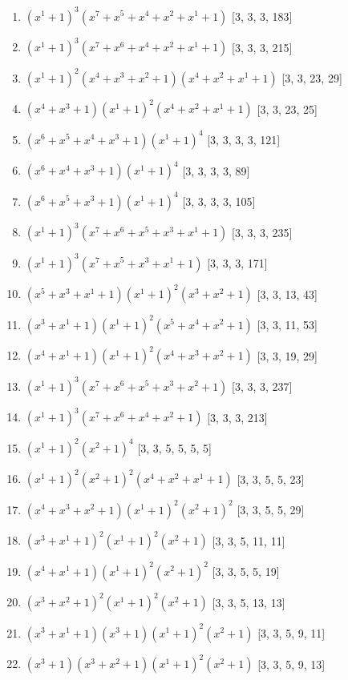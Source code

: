 \documentclass[10pt,twocolumn]{article}
\begin{document}
\begin{enumerate}
\item $(x^{1} + 1)^{3}(x^{7} + x^{5} + x^{4} + x^{2} + x^{1} + 1)$  [3, 3, 3, 183]
\item $(x^{1} + 1)^{3}(x^{7} + x^{6} + x^{4} + x^{2} + x^{1} + 1)$  [3, 3, 3, 215]
\item $(x^{1} + 1)^{2}(x^{4} + x^{3} + x^{2} + 1)(x^{4} + x^{2} + x^{1} + 1)$  [3, 3, 23, 29]
\item $(x^{4} + x^{3} + 1)(x^{1} + 1)^{2}(x^{4} + x^{2} + x^{1} + 1)$  [3, 3, 23, 25]
\item $(x^{6} + x^{5} + x^{4} + x^{3} + 1)(x^{1} + 1)^{4}$  [3, 3, 3, 3, 121]
\item $(x^{6} + x^{4} + x^{3} + 1)(x^{1} + 1)^{4}$  [3, 3, 3, 3, 89]
\item $(x^{6} + x^{5} + x^{3} + 1)(x^{1} + 1)^{4}$  [3, 3, 3, 3, 105]
\item $(x^{1} + 1)^{3}(x^{7} + x^{6} + x^{5} + x^{3} + x^{1} + 1)$  [3, 3, 3, 235]
\item $(x^{1} + 1)^{3}(x^{7} + x^{5} + x^{3} + x^{1} + 1)$  [3, 3, 3, 171]
\item $(x^{5} + x^{3} + x^{1} + 1)(x^{1} + 1)^{2}(x^{3} + x^{2} + 1)$  [3, 3, 13, 43]
\item $(x^{3} + x^{1} + 1)(x^{1} + 1)^{2}(x^{5} + x^{4} + x^{2} + 1)$  [3, 3, 11, 53]
\item $(x^{4} + x^{1} + 1)(x^{1} + 1)^{2}(x^{4} + x^{3} + x^{2} + 1)$  [3, 3, 19, 29]
\item $(x^{1} + 1)^{3}(x^{7} + x^{6} + x^{5} + x^{3} + x^{2} + 1)$  [3, 3, 3, 237]
\item $(x^{1} + 1)^{3}(x^{7} + x^{6} + x^{4} + x^{2} + 1)$  [3, 3, 3, 213]
\item $(x^{1} + 1)^{2}(x^{2} + 1)^{4}$  [3, 3, 5, 5, 5, 5]
\item $(x^{1} + 1)^{2}(x^{2} + 1)^{2}(x^{4} + x^{2} + x^{1} + 1)$  [3, 3, 5, 5, 23]
\item $(x^{4} + x^{3} + x^{2} + 1)(x^{1} + 1)^{2}(x^{2} + 1)^{2}$  [3, 3, 5, 5, 29]
\item $(x^{3} + x^{1} + 1)^{2}(x^{1} + 1)^{2}(x^{2} + 1)$  [3, 3, 5, 11, 11]
\item $(x^{4} + x^{1} + 1)(x^{1} + 1)^{2}(x^{2} + 1)^{2}$  [3, 3, 5, 5, 19]
\item $(x^{3} + x^{2} + 1)^{2}(x^{1} + 1)^{2}(x^{2} + 1)$  [3, 3, 5, 13, 13]
\item $(x^{3} + x^{1} + 1)(x^{3} + 1)(x^{1} + 1)^{2}(x^{2} + 1)$  [3, 3, 5, 9, 11]
\item $(x^{3} + 1)(x^{3} + x^{2} + 1)(x^{1} + 1)^{2}(x^{2} + 1)$  [3, 3, 5, 9, 13]

\end{enumerate}
\end{document}

